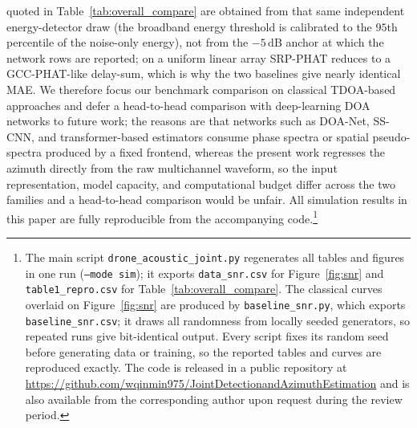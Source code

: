 \documentclass[sensors,article,submit,pdftex,moreauthors]{Definitions/mdpi}
\begin{document}
quoted in Table~\ref{tab:overall_compare} are obtained from that same independent energy-detector draw (the broadband energy threshold is calibrated to the $95$th percentile of the noise-only energy), not from the $-5\,\mathrm{dB}$ anchor at which the network rows are reported; on a uniform linear array SRP-PHAT reduces to a GCC-PHAT-like delay-sum, which is why the two baselines give nearly identical MAE. We therefore focus our benchmark comparison on classical TDOA-based approaches and defer a head-to-head comparison with deep-learning DOA networks to future work; the reasons are that networks such as DOA-Net, SS-CNN, and transformer-based estimators consume phase spectra or spatial pseudo-spectra produced by a fixed frontend, whereas the present work regresses the azimuth directly from the raw multichannel waveform, so the input representation, model capacity, and computational budget differ across the two families and a head-to-head comparison would be unfair. All simulation results in this paper are fully reproducible from the accompanying code.\footnote{The main script \texttt{drone\_acoustic\_joint.py} regenerates all tables and figures in one run (\texttt{--mode sim}); it exports \texttt{data\_snr.csv} for Figure~\ref{fig:snr} and \texttt{table1\_repro.csv} for Table~\ref{tab:overall_compare}. The classical curves overlaid on Figure~\ref{fig:snr} are produced by \texttt{baseline\_snr.py}, which exports \texttt{baseline\_snr.csv}; it draws all randomness from locally seeded generators, so repeated runs give bit-identical output. Every script fixes its random seed before generating data or training, so the reported tables and curves are reproduced exactly. The code is released in a public repository at \url{https://github.com/wqinmin975/JointDetectionandAzimuthEstimation} and is also available from the corresponding author upon request during the review period.}
\end{document}
